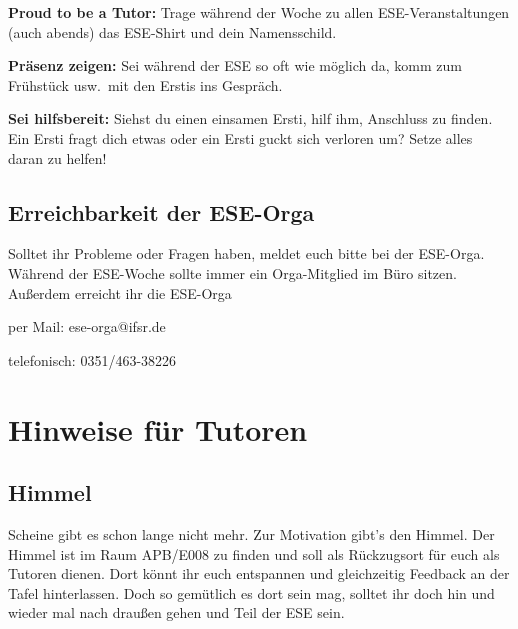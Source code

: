 \documentclass[a4paper,12pt]{report}
\begin{document}
\begin{itemize*}
    \item \textbf{Proud to be a Tutor:} Trage während der Woche zu allen ESE-Veranstaltungen (auch abends) das ESE-Shirt und dein Namensschild.
    \item \textbf{Präsenz zeigen:} Sei während der ESE so oft wie möglich da, komm zum Frühstück usw.\ mit den Erstis ins Gespräch.
    \item \textbf{Sei hilfsbereit:} Siehst du einen einsamen Ersti, hilf ihm, Anschluss zu finden. Ein Ersti fragt dich etwas oder ein Ersti guckt sich verloren um? Setze alles daran zu helfen!
\end{itemize*}

\section*{Erreichbarkeit der ESE-Orga}

Solltet ihr Probleme oder Fragen haben, meldet euch bitte bei der ESE-Orga.
Während der ESE-Woche sollte immer ein Orga-Mitglied im Büro sitzen.
Außerdem erreicht ihr die ESE-Orga
\begin{itemize*}
	\item per Mail: ese-orga@ifsr.de
	\item telefonisch: 0351/463-38226
\end{itemize*}


\tableofcontents
\chapter{Hinweise für Tutoren}
\section{Himmel}
Scheine gibt es schon lange nicht mehr. Zur Motivation gibt's den Himmel. Der Himmel ist im Raum APB/E008 zu finden und soll als Rückzugsort für euch als Tutoren dienen. Dort könnt ihr euch entspannen und gleichzeitig Feedback an der Tafel hinterlassen. Doch so gemütlich es dort sein mag, solltet ihr doch hin und wieder mal nach draußen gehen und Teil der ESE sein.
\end{document}
